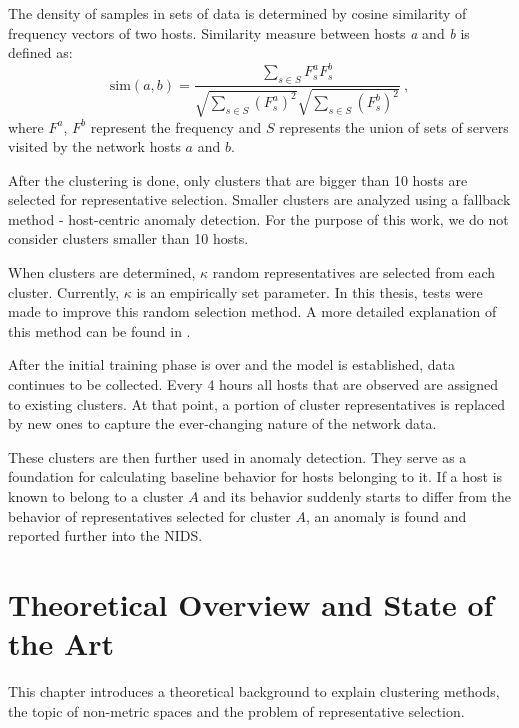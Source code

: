 \documentclass[thesis=B,english]{FITthesis}[2012/10/20]
\begin{document}
The density of samples in sets of data is determined by cosine similarity of frequency vectors of two hosts.
Similarity measure between hosts \textit{a} and \textit{b} is defined as:
\begin{equation}
\textrm{sim}(a, b) = \frac{\sum\limits_{s \in S} F_s^a F_s^b} {\sqrt{\sum\limits_{s \in S} (F_s^a)^2} \sqrt{\sum\limits_{s \in S} (F_s^b)^2}}\:, \tag{2}
\end{equation}
where $F^a$, $F^b$ represent the frequency and $S$ represents the union of sets of servers visited by the network hosts $a$ and $b$.

After the clustering is done, only clusters that are bigger than 10 hosts are selected for representative selection.
Smaller clusters are analyzed using a fallback method - host-centric anomaly detection.
For the purpose of this work, we do not consider clusters smaller than 10 hosts.

When clusters are determined, $\kappa$ random representatives are selected from each cluster.
Currently, $\kappa$ is an empirically set parameter.
In this thesis, tests were made to improve this random selection method.
A more detailed explanation of this method can be found in \cite{kopp2018community}.

After the initial training phase is over and the model is established, data continues to be collected.
Every 4 hours all hosts that are observed are assigned to existing clusters.
At that point, a portion of cluster representatives is replaced by new ones to capture the ever-changing nature of the network data.

These clusters are then further used in anomaly detection.
They serve as a foundation for calculating baseline behavior for hosts belonging to it.
If a host is known to belong to a cluster $A$ and its behavior suddenly starts to differ from the behavior of representatives selected for cluster $A$, an anomaly is found and reported further into the NIDS.


\chapter{Theoretical Overview and State of the Art}\label{ch:theory}

This chapter introduces a theoretical background to explain clustering methods, the topic of non-metric spaces and the problem of representative selection.
\end{document}

